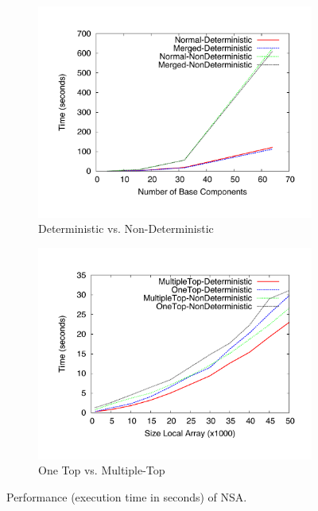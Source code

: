 \begin{figure} \centering
    \begin{subfigure}[b]{0.45\linewidth}
        \includegraphics[scale=0.3]{bench/benchnsa1.pdf}
        \caption{Deterministic vs. Non-Deterministic}\label{bench:nsa1}
    \end{subfigure} %
    \quad
    \begin{subfigure}[b]{0.45\linewidth}    
        \includegraphics[scale=0.3]{bench/benchnsa2.pdf}
         \caption{One Top vs. Multiple-Top}\label{bench:nsa2}    
    \end{subfigure} 
    \caption{Performance (execution time in seconds) of NSA.}
    \label{bench:nsa}
\end{figure}

